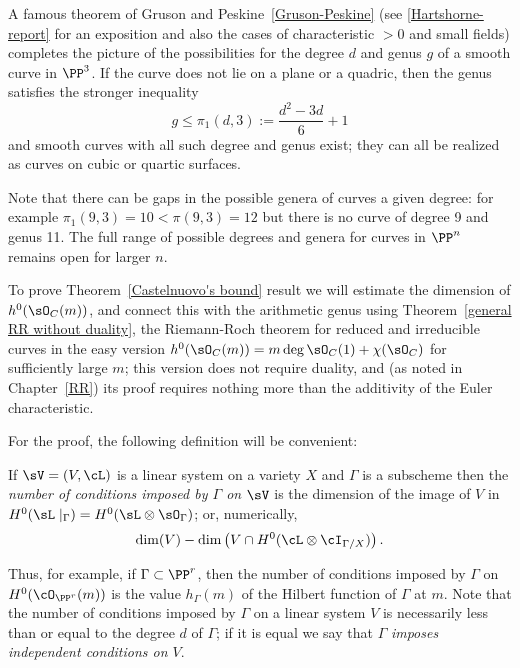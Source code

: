\begin{fact}
A famous theorem of Gruson and Peskine~\ref{Gruson-Peskine} (see \ref{Hartshorne-report} for an exposition and also the cases of characteristic $>0$ and small fields) completes the picture of the possibilities for the degree $d$ and  genus $g$  of a smooth curve in $\PP^3$. If the curve does not lie on a plane or a quadric, then the genus satisfies the stronger inequality
$$
g\leq \pi_1(d,3) := \frac{d^2-3d}{6} +1
$$
and smooth curves with all such degree and genus exist; they can all be realized as curves
on cubic or quartic surfaces.

Note that there can be gaps in the possible genera of curves a given degree: for example  $\pi_1(9,3) = 10<\pi(9,3) =12$ but there is
no curve of degree 9 and genus 11. 
The full range of possible degrees and genera for curves in $\PP^n$ remains open for larger $n$. 
\end{fact}

To prove Theorem~\ref{Castelnuovo's bound} result we will estimate the dimension of $h^0(\sO_C(m))$, and connect this with the 
arithmetic genus using Theorem~\ref{general RR without duality}, the Riemann-Roch theorem for reduced and irreducible curves
in the easy version $h^0(\sO_C(m)) = m\deg \sO_C(1) + \chi(\sO_C)$ for sufficiently large $m$; this version
does not require duality, and (as noted in Chapter~\ref{RR}) its proof requires nothing more than the additivity
of the Euler characteristic. 

For the proof, the following definition will be convenient:

\begin{definition}
If $\sV = (V,\cL)$ is a linear system on a variety $X$ and $\Gamma$ is a subscheme then the \emph{number of conditions
imposed by $\Gamma$ on $\sV$} is the dimension of the image of $V$ in $H^0(\sL\mid_\Gamma) = H^0(\sL \otimes \sO_\Gamma)$; or, numerically,
$$
\dim(V) - \dim \left(V \cap H^0(\cL\otimes \cI_{\Gamma/X}) \right).
$$\end{definition}

Thus, for example, if $\Gamma \subset \PP^r$, then the number of conditions imposed by $\Gamma$ on $H^0(\cO_{\PP^r}(m))$ is the value $h_\Gamma(m)$ of the Hilbert function of $\Gamma$ at $m$.
Note that the number of conditions imposed by $\Gamma$ on a linear system $V$ is necessarily less than or equal to the degree $d$ of $\Gamma$; if it is equal we say that $\Gamma$ \emph{imposes independent conditions on $V$}.

